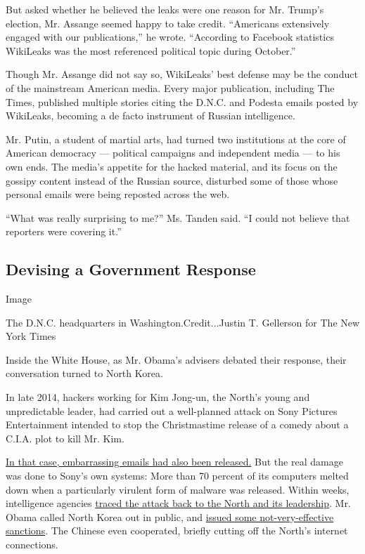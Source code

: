 But asked whether he believed the leaks were one reason for Mr. Trump's
election, Mr. Assange seemed happy to take credit. ``Americans
extensively engaged with our publications,'' he wrote. ``According to
Facebook statistics WikiLeaks was the most referenced political topic
during October.''

Though Mr. Assange did not say so, WikiLeaks' best defense may be the
conduct of the mainstream American media. Every major publication,
including The Times, published multiple stories citing the D.N.C. and
Podesta emails posted by WikiLeaks, becoming a de facto instrument of
Russian intelligence.

Mr. Putin, a student of martial arts, had turned two institutions at the
core of American democracy --- political campaigns and independent media
--- to his own ends. The media's appetite for the hacked material, and
its focus on the gossipy content instead of the Russian source,
disturbed some of those whose personal emails were being reposted across
the web.

``What was really surprising to me?'' Ms. Tanden said. ``I could not
believe that reporters were covering it.''

\hypertarget{devising-a-government-response}{%
\subsection{Devising a Government
Response}\label{devising-a-government-response}}

Image

The D.N.C. headquarters in Washington.Credit...Justin T. Gellerson for
The New York Times

Inside the White House, as Mr. Obama's advisers debated their response,
their conversation turned to North Korea.

In late 2014, hackers working for Kim Jong-un, the North's young and
unpredictable leader, had carried out a well-planned attack on Sony
Pictures Entertainment intended to stop the Christmastime release of a
comedy about a C.I.A. plot to kill Mr. Kim.

\href{https://www.nytimes.com/2014/12/31/business/media/sony-attack-first-a-nuisance-swiftly-grew-into-a-firestorm-.html?_r=0}{In
that case, embarrassing emails had also been released.} But the real
damage was done to Sony's own systems: More than 70 percent of its
computers melted down when a particularly virulent form of malware was
released. Within weeks, intelligence agencies
\href{https://www.nytimes.com/2014/12/31/business/media/sony-attack-first-a-nuisance-swiftly-grew-into-a-firestorm-.html?_r=0}{traced
the attack back to the North and its leadership}. Mr. Obama called North
Korea out in public, and
\href{https://www.nytimes.com/2015/01/03/us/in-response-to-sony-attack-us-levies-sanctions-on-10-north-koreans.html}{issued
some not-very-effective sanctions}. The Chinese even cooperated, briefly
cutting off the North's internet connections.

